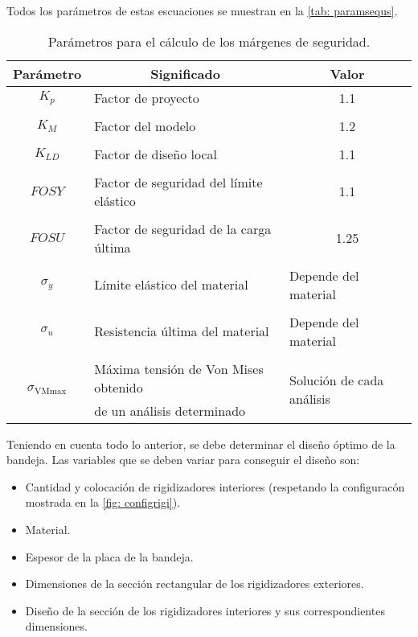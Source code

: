 Todos los parámetros de estas escuaciones se muestran en la \autoref{tab: paramsequs}.

\begin{table}[H]
\centering
\caption{Parámetros para el cálculo de los márgenes de seguridad.}
\label{tab: paramsequs}
\begin{tabular}{c l c}
\toprule
\multicolumn{1}{c}{\textbf{Parámetro}} & \multicolumn{1}{c}{\textbf{Significado}} & \multicolumn{1}{c}{\textbf{Valor}} \\ \midrule
  $K_{p}$   & Factor de proyecto  & 1.1 \\
  & & \\
  $K_{M}$   & Factor del modelo   & 1.2 \\
  & & \\
  $K_{LD}$  & Factor de diseño local & 1.1 \\ 
  & & \\
  $FOSY$    & Factor de seguridad del límite elástico & 1.1 \\
  & & \\ 
  $FOSU$    & Factor de seguridad de la carga última  & 1.25 \\ 
  & & \\
  $\sigma_{y}$ & Límite elástico del material & \multicolumn{1}{l}{Depende del material} \\
  & & \\ 
  $\sigma_{u}$ & Resistencia última del material & \multicolumn{1}{l}{Depende del material} \\ 
  & & \\
  \multirow{2}{*}{$\sigma_{\text{VMmax}}$ }& Máxima tensión de Von Mises obtenido & \multicolumn{1}{l}{\multirow{2}{*}{Solución de cada análisis}} \\ 
  & de un análisis determinado & \\
\bottomrule
\end{tabular}
\end{table}

Teniendo en cuenta todo lo anterior, se debe determinar el diseño óptimo de la bandeja. Las variables que se deben variar para conseguir el diseño son:

\begin{itemize}
\item Cantidad y colocación de rigidizadores interiores (respetando la configuracón mostrada en la \autoref{fig: configrigi}).
\item Material.
\item Espesor de la placa de la bandeja.
\item Dimensiones de la sección rectangular de los rigidizadores exteriores.
\item Diseño de la sección de los rigidizadores interiores y sus correspondientes dimensiones.
\end{itemize}

